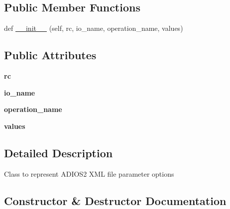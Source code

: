\subsection*{Public Member Functions}
\begin{DoxyCompactItemize}
\item 
def \hyperlink{classcodar_1_1cheetah_1_1parameters_1_1_param_a_d_i_o_s2_x_m_l_af754fa92a1b477dc6fedce88a9375d53}{\+\_\+\+\_\+init\+\_\+\+\_\+} (self, rc, io\+\_\+name, operation\+\_\+name, values)
\end{DoxyCompactItemize}
\subsection*{Public Attributes}
\begin{DoxyCompactItemize}
\item 
\mbox{\label{classcodar_1_1cheetah_1_1parameters_1_1_param_a_d_i_o_s2_x_m_l_a81924cb9239a749e787cf68de5dbe508}} 
{\bfseries rc}
\item 
\mbox{\label{classcodar_1_1cheetah_1_1parameters_1_1_param_a_d_i_o_s2_x_m_l_a383f4e23cc27b608e08ccab3dcc9163d}} 
{\bfseries io\+\_\+name}
\item 
\mbox{\label{classcodar_1_1cheetah_1_1parameters_1_1_param_a_d_i_o_s2_x_m_l_af23a158cb70680fa31d789cf1e1210b1}} 
{\bfseries operation\+\_\+name}
\item 
\mbox{\label{classcodar_1_1cheetah_1_1parameters_1_1_param_a_d_i_o_s2_x_m_l_a031e1eec0b1e5d8e6415157b0026ceea}} 
{\bfseries values}
\end{DoxyCompactItemize}


\subsection{Detailed Description}
\begin{DoxyVerb}Class to represent ADIOS2 XML file parameter options
\end{DoxyVerb}
 

\subsection{Constructor \& Destructor Documentation}
\mbox{\label{classcodar_1_1cheetah_1_1parameters_1_1_param_a_d_i_o_s2_x_m_l_af754fa92a1b477dc6fedce88a9375d53}} 
